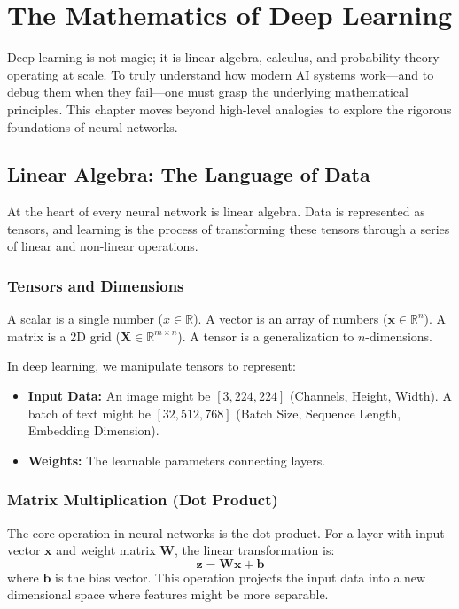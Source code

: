 \chapter{The Mathematics of Deep Learning}
\label{chap:math_dl}

Deep learning is not magic; it is linear algebra, calculus, and probability theory operating at scale. To truly understand how modern AI systems work---and to debug them when they fail---one must grasp the underlying mathematical principles. This chapter moves beyond high-level analogies to explore the rigorous foundations of neural networks.

\section{Linear Algebra: The Language of Data}

At the heart of every neural network is linear algebra. Data is represented as tensors, and learning is the process of transforming these tensors through a series of linear and non-linear operations.

\subsection{Tensors and Dimensions}
A scalar is a single number ($x \in \mathbb{R}$). A vector is an array of numbers ($\mathbf{x} \in \mathbb{R}^n$). A matrix is a 2D grid ($\mathbf{X} \in \mathbb{R}^{m \times n}$). A tensor is a generalization to $n$-dimensions.

In deep learning, we manipulate tensors to represent:
\begin{itemize}
    \item \textbf{Input Data:} An image might be $[3, 224, 224]$ (Channels, Height, Width). A batch of text might be $[32, 512, 768]$ (Batch Size, Sequence Length, Embedding Dimension).
    \item \textbf{Weights:} The learnable parameters connecting layers.
\end{itemize}

\subsection{Matrix Multiplication (Dot Product)}
The core operation in neural networks is the dot product. For a layer with input vector $\mathbf{x}$ and weight matrix $\mathbf{W}$, the linear transformation is:
\begin{equation}
    \mathbf{z} = \mathbf{W}\mathbf{x} + \mathbf{b}
\end{equation}
where $\mathbf{b}$ is the bias vector. This operation projects the input data into a new dimensional space where features might be more separable.

